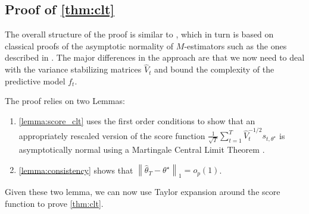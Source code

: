 \documentclass[11pt]{article}
\newcommand{\norm}[1]{\left\lVert#1\right\rVert}
\begin{document}
\begin{appendix}
\subsection{Proof of \cref{thm:clt}}
The overall structure of the proof is similar to \cite{zhang2021mestimators}, which in turn is based on classical proofs of the asymptotic normality of $M$-estimators such as the ones described in \cite{van2000asymptotic}. The major differences in the approach are that we now need to deal with the variance stabilizing matrices $\hat{V}_{t}$ and bound the complexity of the predictive model $f_t$. 

The proof relies on two Lemmas:
\begin{enumerate}
    \item \cref{lemma:score_clt} uses the first order conditions to show that an appropriately rescaled version of the score function $\frac{1}{\sqrt{T}}\sum_{t=1}^{T} \hat{V}_{t}^{-1/2} s_{t,\theta^{\star}}$ is asymptotically normal using a Martingale Central Limit Theorem \citep{hall2014martingale}. 
    \item \cref{lemma:consistency} shows that $\norm{\hat{\theta}_{T}- \theta^{\star}}_{1}= o_{p}(1)$.
\end{enumerate}
Given these two lemma, we can now use Taylor expansion around the score function to prove \cref{thm:clt}.


\end{appendix}
\end{document}
